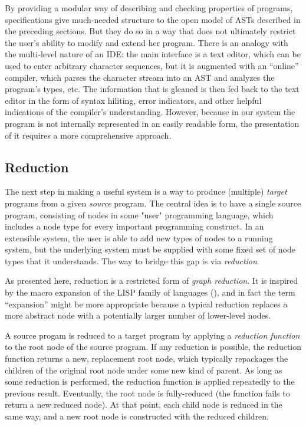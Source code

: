By providing a modular way of describing and checking properties of programs, specifications give much-needed structure to the open model of ASTs described in the preceding sections. But they do so in a way that does not ultimately restrict the user's ability to modify and extend her program. There is an analogy with the multi-level nature of an IDE: the main interface is a text editor, which can be used to enter arbitrary character sequences, but it is augmented with an ``online'' compiler, which parses the character stream into an AST and analyzes the program's types, etc. The information that is gleaned is then fed back to the text editor in the form of syntax hiliting, error indicators, and other helpful indications of the compiler's understanding. However, because in our system the program is not internally represented in an easily readable form, the presentation of it requires a more comprehensive approach.


\subsection{Reduction}
The next step in making a useful system is a way to produce (multiple) \emph{target} programs from a given \emph{source} program. The central idea is to have a single source program, consisting of nodes in some "user" programming language, which includes a node type for every important programming construct. In an extensible system, the user is able to add new types of nodes to a running system, but the underlying system must be supplied with some fixed set of node types that it understands. The way to bridge this gap is via \emph{reduction}.

As presented here, reduction is a restricted form of \emph{graph reduction}. It is inspired by the macro expansion of the LISP family of languages (), and in fact the term ``expansion'' might be more appropriate because a typical reduction replaces a more abstract node with a potentially larger number of lower-level nodes.

A source progam is reduced to a target program by applying a \emph{reduction function} to the root node of the source program. If any reduction is possible, the reduction function returns a new, replacement root node, which typically repackages the children of the original root node under some new kind of parent. As long as some reduction is performed, the reduction function is applied repeatedly to the previous result. Eventually, the root node is fully-reduced (the function fails to return a new reduced node). At that point, each child node is reduced in the same way, and a new root node is constructed with the reduced children.


